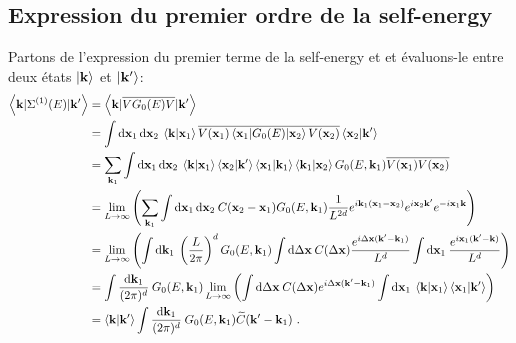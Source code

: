 \subsection{Expression du premier ordre de la self-energy}
Partons de l'expression du premier terme de la self-energy et et évaluons-le entre deux états $\left| \mathbf{k} \right\rangle$ et $\left| \mathbf{k}' \right\rangle$:
\begin{align}
\left\langle \mathbf{k} | \Sigma^{(1)}(E) | \mathbf{k}' \right\rangle &= \left\langle \mathbf{k} | \overline{V G_0(E) V} | \mathbf{k}' \right\rangle \\
&= \int{ \mathop{}\mathopen{}\mathrm{d}\mathbf{x}_{\mathrm{1}} \mathop{}\mathopen{}\mathrm{d}\mathbf{x}_{\mathrm{2}} \: \left\langle \mathbf{k} | \mathbf{x}_{\mathrm{1}} \right\rangle \overline{V(\mathbf{x}_{\mathrm{1}}) \left\langle \mathbf{x}_{\mathrm{1}} | G_0(E) | \mathbf{x}_{\mathrm{2}}\right\rangle V(\mathbf{x}_{\mathrm{2}}) } \left\langle \mathbf{x}_{\mathrm{2}} |\mathbf{k}' \right\rangle} \\
&= \sum_{\mathbf{k}_{\mathrm{1}}}{\int{\mathop{}\mathopen{}\mathrm{d}\mathbf{x}_{\mathrm{1}} \mathop{}\mathopen{}\mathrm{d}\mathbf{x}_{\mathrm{2}} \: \left\langle \mathbf{k} |\mathbf{x}_{\mathrm{1}} \right\rangle \left\langle \mathbf{x}_{\mathrm{2}} | \mathbf{k}' \right\rangle \left\langle \mathbf{x}_{\mathrm{1}} | \mathbf{k}_{\mathrm{1}} \right\rangle \left\langle \mathbf{k}_{\mathrm{1}} | \mathbf{x}_{\mathrm{2}} \right\rangle G_0(E,\mathbf{k}_{\mathrm{1}})\overline{V(\mathbf{x}_{\mathrm{1}})V(\mathbf{x}_{\mathrm{2}})}}} \\
&= \lim\limits_{L\rightarrow\infty} \left( \sum_{\mathbf{k}_{\mathrm{1}}}{\int{\mathop{}\mathopen{}\mathrm{d}\mathbf{x}_{\mathrm{1}}\mathop{}\mathopen{}\mathrm{d}\mathbf{x}_{\mathrm{2}}\: C(\mathbf{x}_{\mathrm{2}}-\mathbf{x}_{\mathrm{1}}) G_0(E,\mathbf{k}_{\mathrm{1}}) \frac{1}{L^{2d}} e^{i \mathbf{k}_{\mathrm{1}}(\mathbf{x}_{\mathrm{1}}-\mathbf{x}_{\mathrm{2}})} e^{i \mathbf{x}_{\mathrm{2}} \mathbf{k}'} e^{-i \mathbf{x}_{\mathrm{1}} \mathbf{k}} }} \right) \\
&= \lim\limits_{L\rightarrow\infty} \left( \int{\mathop{}\mathopen{}\mathrm{d}\mathbf{k}_{\mathrm{1}} \: \left(\frac{L}{2\pi}\right)^d G_0(E,\mathbf{k}_{\mathrm{1}}) \int{\mathop{}\mathopen{}\mathrm{d}\Delta\mathbf{x} \: C(\Delta\mathbf{x}) \frac{e^{i \Delta\mathbf{x}(\mathbf{k}'-\mathbf{k}_{\mathrm{1}})}}{L^d}} \int{\mathop{}\mathopen{}\mathrm{d}\mathbf{x}_{\mathrm{1}} \: \frac{e^{i \mathbf{x}_{\mathrm{1}}(\mathbf{k}'-\mathbf{k})}}{L^d}} } \right) \\
&=\int{\frac{\mathop{}\mathopen{}\mathrm{d}\mathbf{k}_{\mathrm{1}}}{(2\pi)^d} \: G_0(E,\mathbf{k}_{\mathrm{1}}) \lim\limits_{L\rightarrow\infty}\left( \int{\mathop{}\mathopen{}\mathrm{d}\Delta\mathbf{x} \: C(\Delta\mathbf{x}) e^{i\Delta\mathbf{x}(\mathbf{k}'-\mathbf{k}_{\mathrm{1}})}} \int{\mathop{}\mathopen{}\mathrm{d}\mathbf{x}_{\mathrm{1}} \: \left\langle \mathbf{k} | \mathbf{x}_{\mathrm{1}}\right\rangle \left\langle \mathbf{x}_{\mathrm{1}} | \mathbf{k}' \right\rangle } \right)} \\
&= \left\langle \mathbf{k} | \mathbf{k}' \right\rangle \int{\frac{\mathop{}\mathopen{}\mathrm{d}\mathbf{k}_{\mathrm{1}}}{(2\pi)^d} \: G_0(E,\mathbf{k}_{\mathrm{1}}) \widetilde{C}(\mathbf{k}'-\mathbf{k}_{\mathrm{1}})} \text{ .}
\end{align}
